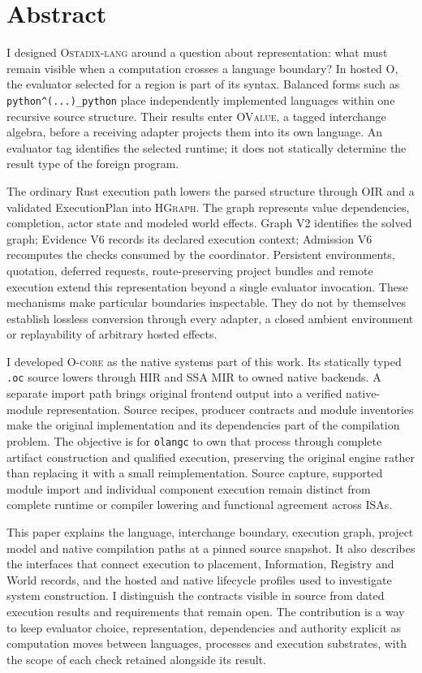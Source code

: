 \documentclass[11pt,oneside]{article}
\newcommand{\product}{{\mdseries\textsc{Ostadix-lang}}}
\newcommand{\ovalue}{{\mdseries\textsc{OValue}}}
\newcommand{\oir}{{\mdseries\textsc{OIR}}}
\newcommand{\hgraph}{{\mdseries\textsc{HGraph}}}
\newcommand{\ocore}{{\mdseries\textsc{O-core}}}
\begin{document}
\color{OInk}
\hypersetup{pageanchor=true}

\section*{Abstract}

I designed \product{} around a question about representation: what must remain
visible when a computation crosses a language boundary? In hosted O, the
evaluator selected for a region is part of its syntax. Balanced forms such as
\texttt{python\string^(...\string)\_python} place independently implemented
languages within one recursive source structure. Their results enter
\ovalue{}, a tagged interchange algebra, before a receiving adapter projects
them into its own language. An evaluator tag identifies the selected runtime;
it does not statically determine the result type of the foreign program.

The ordinary Rust execution path lowers the parsed structure through \oir{}
and a validated ExecutionPlan into \hgraph{}. The graph represents value
dependencies, completion, actor state and modeled world effects. Graph V2
identifies the solved graph; Evidence V6 records its declared execution
context; Admission V6 recomputes the checks consumed by the coordinator.
Persistent environments, quotation, deferred requests, route-preserving
project bundles and remote execution extend this representation beyond a
single evaluator invocation. These mechanisms make particular boundaries
inspectable. They do not by themselves establish lossless conversion through
every adapter, a closed ambient environment or replayability of arbitrary
hosted effects.

I developed \ocore{} as the native systems part of this work. Its statically
typed \texttt{.oc} source lowers through HIR and SSA MIR to owned native
backends. A separate import path brings original frontend output into a
verified native-module representation. Source recipes, producer contracts and
module inventories make the original implementation and its dependencies
part of the compilation problem. The objective is for \texttt{olangc} to own
that process through complete artifact construction and qualified execution,
preserving the original engine rather than replacing it with a small
reimplementation. Source capture, supported module import and individual
component execution remain distinct from complete runtime or compiler
lowering and functional agreement across ISAs.

This paper explains the language, interchange boundary, execution graph,
project model and native compilation paths at a pinned source snapshot. It
also describes the interfaces that connect execution to placement,
Information, Registry and World records, and the hosted and native lifecycle
profiles used to investigate system construction. I distinguish the contracts
visible in source from dated execution results and requirements that remain
open. The contribution is a way to keep evaluator choice, representation,
dependencies and authority explicit as computation moves between languages,
processes and execution substrates, with the scope of each check retained
alongside its result.
\end{document}
